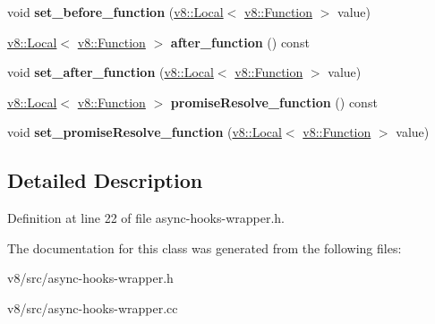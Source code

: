 \begin{DoxyCompactItemize}
\item 
\mbox{\label{classv8_1_1AsyncHooksWrap_a34129e18258cc73b41d442b4029d40d3}} 
void {\bfseries set\+\_\+before\+\_\+function} (\mbox{\hyperlink{classv8_1_1Local}{v8\+::\+Local}}$<$ \mbox{\hyperlink{classv8_1_1Function}{v8\+::\+Function}} $>$ value)
\item 
\mbox{\label{classv8_1_1AsyncHooksWrap_a82b6940b0fe39a464ebe1c131a55d949}} 
\mbox{\hyperlink{classv8_1_1Local}{v8\+::\+Local}}$<$ \mbox{\hyperlink{classv8_1_1Function}{v8\+::\+Function}} $>$ {\bfseries after\+\_\+function} () const
\item 
\mbox{\label{classv8_1_1AsyncHooksWrap_a3bb0f99aea2abf77b2447ec4c5fa63e2}} 
void {\bfseries set\+\_\+after\+\_\+function} (\mbox{\hyperlink{classv8_1_1Local}{v8\+::\+Local}}$<$ \mbox{\hyperlink{classv8_1_1Function}{v8\+::\+Function}} $>$ value)
\item 
\mbox{\label{classv8_1_1AsyncHooksWrap_a8f465556521fa65ba92548635f09933f}} 
\mbox{\hyperlink{classv8_1_1Local}{v8\+::\+Local}}$<$ \mbox{\hyperlink{classv8_1_1Function}{v8\+::\+Function}} $>$ {\bfseries promise\+Resolve\+\_\+function} () const
\item 
\mbox{\label{classv8_1_1AsyncHooksWrap_a6dd783f0764486f7e1e4155854b274b2}} 
void {\bfseries set\+\_\+promise\+Resolve\+\_\+function} (\mbox{\hyperlink{classv8_1_1Local}{v8\+::\+Local}}$<$ \mbox{\hyperlink{classv8_1_1Function}{v8\+::\+Function}} $>$ value)
\end{DoxyCompactItemize}


\subsection{Detailed Description}


Definition at line 22 of file async-\/hooks-\/wrapper.\+h.



The documentation for this class was generated from the following files\+:\begin{DoxyCompactItemize}
\item 
v8/src/async-\/hooks-\/wrapper.\+h\item 
v8/src/async-\/hooks-\/wrapper.\+cc\end{DoxyCompactItemize}
